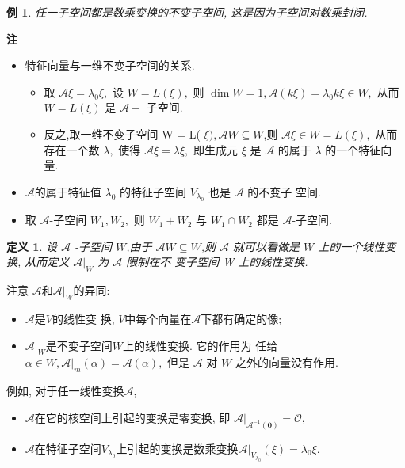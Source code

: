 \documentclass[13pt]{beamer}
\newtheorem{exa}{例}
\newtheorem*{defi}{定义}
\def\A{\mathscr{A}}
\def\O{\mathscr{O}}
\def\0{\mathbf{0}}
\begin{document}
\begin{frame}
\begin{exa}
	任一子空间都是数乘变换的不变子空间, 这是因为子空间对数乘封闭.
\end{exa}
{\bf 注~~ }

\begin{itemize}
	\item 特征向量与一维不变子空间的关系.

\begin{itemize}
	\item 取 $\A  \xi=\lambda_{0} \xi,$ 设 $W=L(\xi),$ 则 $\operatorname{dim} W=1, \A (k \xi)=\lambda_{0} k \xi \in W,$ 从而 $W=L(\xi)$ 是 $\A -$ 子空间.
	\item 反之,取一维不变子空间 W = L( $\xi), \A  W \subseteq W$,则 $\A  \xi \in W=L(\xi),$ 从而存在一个数 $\lambda,$ 使得 $\A  \xi=\lambda \xi,$ 即生成元 $\xi$ 是 $\A $ 的属于 $\lambda$ 的一个特征向量.
\end{itemize}

\item $\A$的属于特征值 $\lambda_{0}$ 的特征子空间 $V_{\lambda_{0}}$ 也是 $\mathscr{A}$ 的不变子
空间.

\item 取 $\A$-子空间 $W_{1}, W_{2},$ 则 $W_{1}+W_{2}$ 与 $W_{1} \cap W_{2}$ 都是 $\A$-子空间.

\end{itemize}

\end{frame}


\begin{frame}
\begin{defi}
设 $\A $ -子空间 $W$,由于 $\A  W \subseteq W$,则 $\A $ 就可以看做是 $W$ 上的一个线性变换, 
从而定义 $\left.\A \right|_{W}$ 为 $\A$ \alert{限制}在不
变子空间 W 上的线性变换.
\end{defi}



注意 $\A$和$\A|_W$的异同: 
\begin{itemize}
\item $\A$是$V$的线性变
换, $V$中每个向量在$\A$下都有确定的像; 
\item $\A|_W$是不变子空间$W$上的线性变换. 
它的作用为
任给 $\alpha \in W,\left.\A \right|_{m}(\alpha)=\A (\alpha),$ 但是 $\A $ 对 $W$ 之外的向量没有作用.

\end{itemize}

例如, 对于任一线性变换$\A$,
\begin{itemize}
\item  $\A$在它的核空间上引起的变换是零变换, 即 $\A |_{\A^{-1}(\0)} = \O$,
\item $\A$在特征子空间$V_{\lambda_0}$上引起的变换是数乘变换$\A|_{V_{\lambda_0}}(\xi)=\lambda_0 \xi$.
\end{itemize}
\end{frame}
\end{document}
